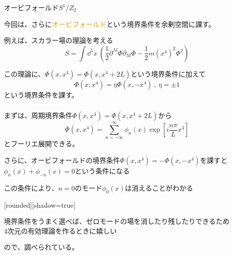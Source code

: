 \documentclass[
  unicode,a4paper,10pt,
  xcolor = {dvipsnames,svgnames},
  hyperref ={colorlinks=true,citecolor=Navy,linkcolor=NavyBlue,urlcolor=purple},
  ja=standard,lualatex
]{beamer}
\begin{document}
\begin{frame}{オービフォールド$S^{1}/Z_{2}$}

  今回は、さらに\textcolor{Goldenrod}{オービフォールド}という境界条件を余剰空間に課す。
  
  \pause
  \vspace*{10pt}

  例えば、スカラー場の理論を考える
  \begin{equation}
    S
    =
    \int\dd^5 x\ 
    \left(  
      \frac{1}{2}\partial^{M}\Phi\partial_{M}\Phi
      -
      \frac{1}{2}m(x^{4})^2\Phi^2
    \right)
    \nonumber
  \end{equation}

  この理論に、$\Phi(x,x^{4})=\Phi(x,x^{4}+2L)$という境界条件に加えて
  \begin{equation}
    \Phi(x,x^{4})
    =
    \eta
    \Phi(x,-x^{4})
    \ ,\ 
    \eta=\pm 1
    \nonumber
  \end{equation}
  という境界条件を課す。  

\end{frame}

\begin{frame}
  \frametitle{}

  まずは、周期境界条件$\Phi(x,x^{4})=\Phi(x,x^{4}+2L)$から
  \begin{equation}
    \Phi(x,x^{4})
    =
    \sum_{n=-\infty}^{\infty}\phi_{n}(x) \exp \left[ i\frac{n\pi}{L}x^{4} \right]
    \nonumber
  \end{equation}
  とフーリエ展開できる。

  \vspace*{5pt}

  さらに、オービフォールドの境界条件$\Phi(x,x^{4})=-\Phi(x,-x^{4})$を課すと$\phi_{n}(x)+\phi_{-n}(x)=0$という条件になる

  \vspace*{5pt}

  この条件により、$n=0$のモード$\phi_{0}(x)$は消えることがわかる

  \pause
  \vspace*{5pt}

  [rounded][shadow=true]
  \begin{block}{}
    \centering
    境界条件をうまく選べば、ゼロモードの場を消したり残したりできるため
    \\
    4次元の有効理論を作るときに嬉しい
  \end{block}
  ので、調べられている。

\end{frame}
\end{document}
